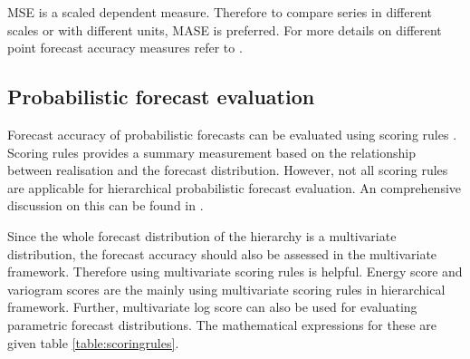 \documentclass[graybox]{svmult}
\begin{document}
MSE is a scaled dependent measure. Therefore to compare series in different scales or with different units, MASE is preferred. For more details on different point forecast accuracy measures refer to \cite{hyndman2018forecasting}.

\subsection{Probabilistic forecast evaluation}

Forecast accuracy of probabilistic forecasts can be evaluated using scoring rules \cite{Gneiting2014}. Scoring rules provides a summary measurement based on the relationship between realisation and the forecast distribution. However, not all scoring rules are applicable for hierarchical probabilistic forecast evaluation. An comprehensive discussion on this can be found in \cite{Gamakumara2018}.

Since the whole forecast distribution of the hierarchy is a multivariate distribution, the forecast accuracy should also be assessed in the multivariate framework. Therefore using multivariate scoring rules is helpful. Energy score \citep{Gneiting2008} and variogram scores \citep{SCHEUERER2015} are the mainly using multivariate scoring rules in hierarchical framework. Further, multivariate log score \citep{Gneiting2007} can also be used for evaluating parametric forecast distributions. The mathematical expressions for these are given table \ref{table:scoringrules}.
\end{document}
